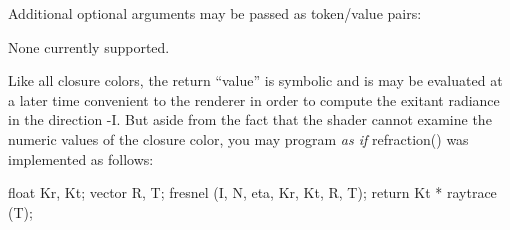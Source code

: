 \documentclass[11pt,letterpaper]{book}
\def\colorclosure{{\cf closure color}\xspace}
\def\closurecolors{{\cf closure color}s\xspace}
\begin{document}
Additional optional arguments may be passed as token/value pairs:

\hspace{0.5in}None currently supported.
\vspace{.25in}



Like all \closurecolors, the return ``value'' is symbolic and is may be
evaluated at a later time convenient to the renderer in order to compute
the exitant radiance in the direction {\cf -I}.  But aside from the
fact that the shader cannot examine the numeric values of the
\colorclosure, you may program \emph{as if} {\cf refraction()} was
implemented as follows:

\begin{code}
    float Kr, Kt;
    vector R, T;
    fresnel (I, N, eta, Kr, Kt, R, T);
    return Kt * raytrace (T);
\end{code}

\begin{comment}
If \emph{source} is supplied, it indicates the name of a geometry set to
ray-trace against, or of an environment map to read (if not set, the
renderer will use a global default).  If \emph{angle} is supplied, it
specifies the angle (in radians) of a cone of centered around the
refraction direction, from which refraction information will be sampled
(this results in a blurred refraction).
\end{comment}

\apiend

\begin{comment}   %
\apiitem{\colorclosure\ {\ce refraction} (vector R, float eta) \\
\colorclosure\ {\ce refraction} (vector R, float eta, float angle) \\
\colorclosure\ {\ce refraction} (string source, vector R, float eta) \\
\colorclosure\ {\ce refraction} (string source, vector R, float eta, float angle)}
\indexapi{refraction()}
These alternative versions of {\cf refraction()} explicitly specify a
refraction direction \emph{R}.  These are only supplied for the rare
case where you need to use a nonphysical refraction direction, and
introduce an undesired view-dependence to the surface description that
you can avoid by using the version of {\cf refraction()} that
automatically calculates the refraction vector for you.  View-dependence
may confuse or defeat clever renderer speedups or intelligent sampling
strategies.  Use with caution!
\apiend
\end{comment}
\end{document}
